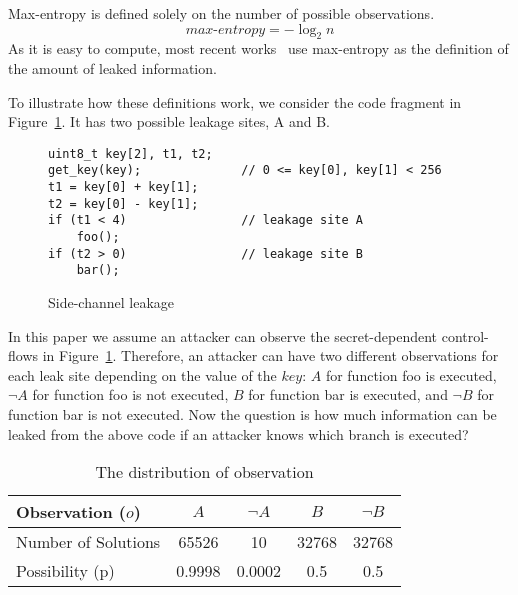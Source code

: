Max-entropy is defined solely on the number of possible observations.
\begin{displaymath}
    \mathit{max\text{-}entropy} = -\log_2{n}
\end{displaymath}
As it is easy to compute, most recent works~\cite{182946,Doychev:2017:RAS:3062341.3062388} use max-entropy as the definition of
the amount of leaked information.

To illustrate how these definitions work, we consider the code
fragment in Figure~\ref{fig:side-channel}. It has two possible leakage sites, A and B.

\begin{figure}[h!]
\centering
\begin{lstlisting}[xleftmargin=.03\textwidth,xrightmargin=.01\textwidth]
uint8_t key[2], t1, t2;
get_key(key);              // 0 <= key[0], key[1] < 256
t1 = key[0] + key[1];
t2 = key[0] - key[1];
if (t1 < 4)                // leakage site A
    foo();                             
if (t2 > 0)                // leakage site B     
    bar();                             
\end{lstlisting}
\vspace*{-1pt}
    \caption{Side-channel leakage}
    \label{fig:side-channel}
\end{figure}
In this paper we assume an attacker can observe the secret-dependent control-flows in 
Figure~\ref{fig:side-channel}.
Therefore, an attacker can have two different observations for each leak site
depending on the value of the $\mathit{key}$: $A$ for function \textsf{foo} is executed, 
$\neg A$ for function \textsf{foo} is not executed, $B$ for function \textsf{bar} is
executed, and $\neg B$ for function \textsf{bar} is not executed. Now the
question is how much information can be leaked from the above code if an
attacker knows which branch is executed?

\begin{table}[ht]
    \centering\small\footnotesize
    \caption{The distribution of observation}\label{shtable}
    \vspace*{-0pt}
    \begin{tabular}{l|cc|cc}
        \hline
        Observation ($o$)   & $A$ & $\neg A$ & $B$ & $\neg B$ \\ \hline
        Number of Solutions & 65526       & 10        & 32768     & 32768           \\ \hline
        Possibility (p)     & 0.9998      & 0.0002    & 0.5    & 0.5       \\
        \hline
    \end{tabular}
\end{table}

